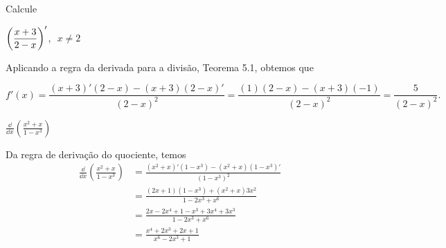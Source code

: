 \cleardoublepage\documentclass[../main.tex]{subfiles}
\begin{document}
\begin{exeresol}
  Calcule\\
\begin{compactenum}[a)]
  \item \(\left(\dfrac{x+3}{2-x}\right)'\), \(\,\,x\neq 2\)
  \begin{resol}
    Aplicando a regra da derivada para a divisão, Teorema 5.1, obtemos que

\[ f'(x)=\dfrac{(x+3)'(2-x) -(x+3)(2-x)'}{(2-x)^2}=\dfrac{(1)(2-x) -(x+3)(-1)}{(2-x)^2}=\dfrac{5}{(2-x)^2}. \]
  \end{resol}

 \item  \(    \frac{\dd}{\dd x}\left(\frac{x^2+x}{1-x^3}\right)\)
 \begin{resol}
  Da regra de derivação do quociente, temos
  \begin{align*}
    \frac{\dd}{\dd x}\left(\frac{x^2+x}{1-x^3}\right) &= \frac{(x^2+x)'(1-x^3)-(x^2+x)(1-x^3)'}{(1-x^3)^2}\\
                                                      &= \frac{(2x+1)(1-x^3)+(x^2+x)3x^2}{1-2x^3+x^6} \\
                                                      &= \frac{2x-2x^4+1-x^3+3x^4+3x^3}{1-2x^3+x^6} \\
                                                      &= \frac{x^4+2x^3+2x+1}{x^6-2x^3+1}
  \end{align*}
  
  \end{resol}
  \end{compactenum}
\end{exeresol}
\end{document}
